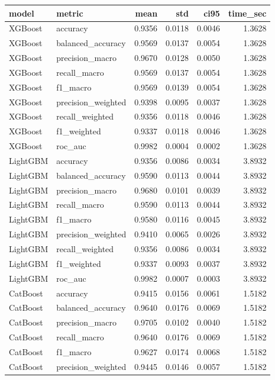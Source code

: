 \begin{tabular}{llrrrr}
\toprule
model & metric & mean & std & ci95 & time_sec \\
\midrule
XGBoost & accuracy & 0.9356 & 0.0118 & 0.0046 & 1.3628 \\
XGBoost & balanced_accuracy & 0.9569 & 0.0137 & 0.0054 & 1.3628 \\
XGBoost & precision_macro & 0.9670 & 0.0128 & 0.0050 & 1.3628 \\
XGBoost & recall_macro & 0.9569 & 0.0137 & 0.0054 & 1.3628 \\
XGBoost & f1_macro & 0.9569 & 0.0139 & 0.0054 & 1.3628 \\
XGBoost & precision_weighted & 0.9398 & 0.0095 & 0.0037 & 1.3628 \\
XGBoost & recall_weighted & 0.9356 & 0.0118 & 0.0046 & 1.3628 \\
XGBoost & f1_weighted & 0.9337 & 0.0118 & 0.0046 & 1.3628 \\
XGBoost & roc_auc & 0.9982 & 0.0004 & 0.0002 & 1.3628 \\
LightGBM & accuracy & 0.9356 & 0.0086 & 0.0034 & 3.8932 \\
LightGBM & balanced_accuracy & 0.9590 & 0.0113 & 0.0044 & 3.8932 \\
LightGBM & precision_macro & 0.9680 & 0.0101 & 0.0039 & 3.8932 \\
LightGBM & recall_macro & 0.9590 & 0.0113 & 0.0044 & 3.8932 \\
LightGBM & f1_macro & 0.9580 & 0.0116 & 0.0045 & 3.8932 \\
LightGBM & precision_weighted & 0.9410 & 0.0065 & 0.0026 & 3.8932 \\
LightGBM & recall_weighted & 0.9356 & 0.0086 & 0.0034 & 3.8932 \\
LightGBM & f1_weighted & 0.9337 & 0.0093 & 0.0037 & 3.8932 \\
LightGBM & roc_auc & 0.9982 & 0.0007 & 0.0003 & 3.8932 \\
CatBoost & accuracy & 0.9415 & 0.0156 & 0.0061 & 1.5182 \\
CatBoost & balanced_accuracy & 0.9640 & 0.0176 & 0.0069 & 1.5182 \\
CatBoost & precision_macro & 0.9705 & 0.0102 & 0.0040 & 1.5182 \\
CatBoost & recall_macro & 0.9640 & 0.0176 & 0.0069 & 1.5182 \\
CatBoost & f1_macro & 0.9627 & 0.0174 & 0.0068 & 1.5182 \\
CatBoost & precision_weighted & 0.9445 & 0.0146 & 0.0057 & 1.5182 \\

\end{tabular}
